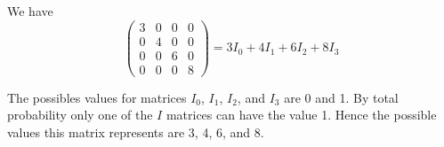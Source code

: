 


\bigskip
We have
\begin{equation*}
\begin{pmatrix}
3&0&0&0\\
0&4&0&0\\
0&0&6&0\\
0&0&0&8
\end{pmatrix}=3I_0+4I_1+6I_2+8I_3
\end{equation*}

The possibles values for matrices $I_0$, $I_1$, $I_2$, and $I_3$ are 0 and 1.
By total probability only one of the $I$ matrices can have the value 1.
Hence the possible values this matrix represents are 3, 4, 6, and 8.


